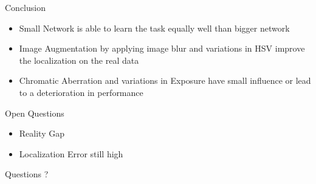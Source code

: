 \documentclass{beamer}
\begin{document}
\begin{darkframes}
\begin{frame}{Conclusion}
    \begin{itemize}
    	\item Small Network is able to learn the task equally well than bigger network
    	\item Image Augmentation by applying image blur and variations in HSV improve the localization on the real data
    	\item Chromatic Aberration and variations in Exposure have small influence or lead to a deterioration in performance 
    \end{itemize}
    \end{frame}

       \begin{frame}{Open Questions}
\begin{itemize}
	\item Reality Gap
	\item Localization Error still high
  \end{itemize} 
\end{frame}
    \begin{frame}{Questions}
    \centering
\huge ?
    	\end{frame}
    
    
  \end{darkframes}
\end{document}
